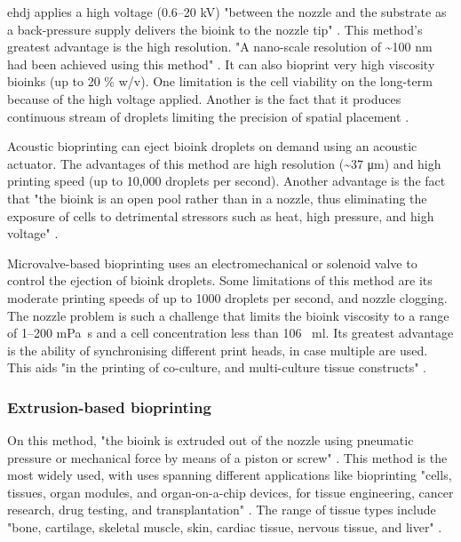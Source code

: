 \gls{ehdj} applies a high voltage (\numrange{0.6}{20} \si{\kilo\volt}) "between the nozzle and the substrate as a back-pressure supply delivers the bioink to the nozzle tip" \cite{Vijayavenkataraman2018_bioprinting_tissues_organs_regen_med}. This method's greatest advantage is the high resolution. "A nano-scale resolution of \textasciitilde 100 \si{\nano\meter} had been achieved using this method" \cite{Vijayavenkataraman2018_bioprinting_tissues_organs_regen_med}. It can also bioprint very high viscosity bioinks (up to 20 \% w/v). One limitation is the cell viability on the long-term because of the high voltage applied. Another is the fact that it produces continuous stream of droplets limiting the precision of spatial placement \cite{Vijayavenkataraman2018_bioprinting_tissues_organs_regen_med}.

Acoustic bioprinting can eject bioink droplets on demand using an acoustic actuator. The advantages of this method are high resolution (\textasciitilde 37 \si{\micro\meter}) and high printing speed (up to 10,000 droplets per second). Another advantage is the fact that "the
bioink is an open pool rather than in a nozzle, thus eliminating the exposure of cells to detrimental stressors such as heat, high pressure, and high voltage" \cite{Vijayavenkataraman2018_bioprinting_tissues_organs_regen_med}.

Microvalve-based bioprinting uses an electromechanical or solenoid valve to control the ejection of bioink droplets. Some limitations of this method are its moderate printing speeds of up to 1000 droplets per second, and nozzle clogging. The nozzle problem is such a challenge that limits the bioink viscosity to a range of \numrange{1}{200} \si{\milli\pascal\second} and a cell concentration less than 106 \si{\per\milli\litre}. Its greatest advantage is the ability of synchronising different print heads, in case multiple are used. This aids "in the printing of co-culture, and multi-culture tissue constructs" \cite{Vijayavenkataraman2018_bioprinting_tissues_organs_regen_med}.


\subsubsection{Extrusion-based bioprinting}
\label{subsubsec:extrusion_based_bioprinting}

On this method, "the bioink is extruded out of the nozzle using pneumatic pressure or mechanical force by means of a piston or screw" \cite{Vijayavenkataraman2018_bioprinting_tissues_organs_regen_med}. This method is the most widely used, with uses spanning different applications like bioprinting "cells, tissues, organ modules, and organ-on-a-chip devices, for tissue engineering, cancer research, drug testing, and transplantation" \cite{Vijayavenkataraman2018_bioprinting_tissues_organs_regen_med}. The range of tissue types include "bone, cartilage, skeletal muscle, skin, cardiac tissue, nervous tissue, and liver" \cite{Vijayavenkataraman2018_bioprinting_tissues_organs_regen_med}.

